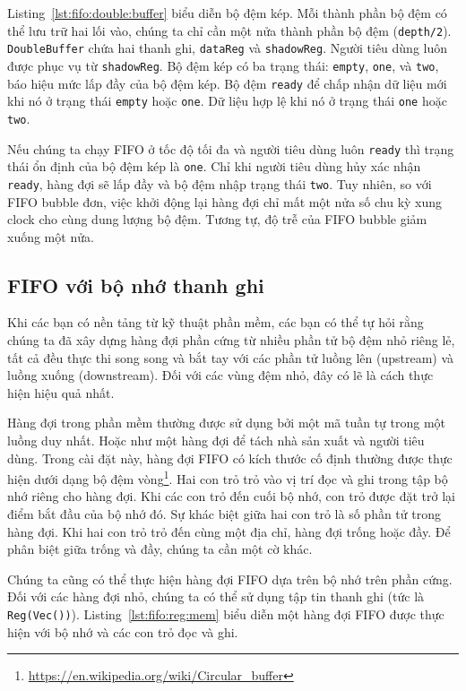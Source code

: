 \documentclass[%
    10pt,
    headinclude, footexclude,
    openright, %
    notitlepage,
    cleardoubleempty,
    headsepline,
    pointlessnumbers,
    bibtotoc, idxtotoc,
    ]{scrbook}
\newcommand{\code}[1]{{\small{\texttt{#1}}}}
\newcommand{\myref}[2]{\href{#1}{#2}}
\renewcommand{\myref}[2]{{#2}{\footnote{\url{#1}}}}
\begin{document}
Listing~\ref{lst:fifo:double:buffer} biểu diễn bộ đệm kép. Mỗi thành phần bộ đệm có thể lưu trữ hai lối vào, chúng ta chỉ cần một nửa thành phần bộ đệm (\code{depth/2}). \code{DoubleBuffer} chứa hai thanh ghi, \code{dataReg} và \code{shadowReg}. Người tiêu dùng luôn được phục vụ từ \code{shadowReg}. Bộ đệm kép có ba trạng thái: \code{empty}, \code{one}, và \code{two}, báo hiệu mức lấp đầy của bộ đệm kép. Bộ đệm \code{ready} để chấp nhận dữ liệu mới khi nó ở trạng thái \code{empty} hoặc \code{one}. Dữ liệu hợp lệ khi nó ở trạng thái \code{one} hoặc \code{two}.

Nếu chúng ta chạy FIFO ở tốc độ tối đa và người tiêu dùng luôn \code{ready} thì trạng thái ổn định của bộ đệm kép là \code{one}. Chỉ khi người tiêu dùng hủy xác nhận \code{ready}, hàng đợi sẽ lấp đầy và bộ đệm nhập trạng thái \code{two}. Tuy nhiên, so với FIFO bubble đơn, việc khởi động lại hàng đợi chỉ mất một nửa số chu kỳ xung clock cho cùng dung lượng bộ đệm. Tương tự, độ trễ của FIFO bubble giảm xuống một nửa. 

\subsection{FIFO với bộ nhớ thanh ghi}

Khi các bạn có nền tảng từ kỹ thuật phần mềm, các bạn có thể tự hỏi rằng chúng ta đã xây dựng hàng đợi phần cứng từ nhiều phần tử bộ đệm nhỏ riêng lẻ, tất cả đều thực thi song song và bắt tay với các phần tử luồng lên (upstream) và luồng xuống (downstream). Đối với các vùng đệm nhỏ, đây có lẽ là cách thực hiện hiệu quả nhất. 


Hàng đợi trong phần mềm thường được sử dụng bởi một mã tuần tự trong một luồng duy nhất. Hoặc như một hàng đợi để tách nhà sản xuất và người tiêu dùng. Trong cài đặt này, hàng đợi FIFO có kích thước cố định thường được thực hiện dưới dạng \myref{https://en.wikipedia.org/wiki/Circular_buffer}{bộ đệm vòng}.
Hai con trỏ trỏ vào vị trí đọc và ghi trong tập bộ nhớ riêng cho hàng đợi. Khi các con trỏ đến cuối bộ nhớ, con trỏ được đặt trở lại điểm bắt đầu của bộ nhớ đó. Sự khác biệt giữa hai con trỏ là số phần tử trong hàng đợi. Khi hai con trỏ trỏ đến cùng một địa chỉ, hàng đợi trống hoặc đầy. Để phân biệt giữa trống và đầy, chúng ta cần một cờ khác. 

Chúng ta cũng có thể thực hiện hàng đợi FIFO dựa trên bộ nhớ trên phần cứng. Đối với các hàng đợi nhỏ, chúng ta có thể sử dụng tập tin thanh ghi (tức là \code{Reg(Vec())}). Listing~\ref{lst:fifo:reg:mem} biểu diễn một hàng đợi FIFO được thực hiện với bộ nhớ và các con trỏ đọc và ghi. 
\end{document}

